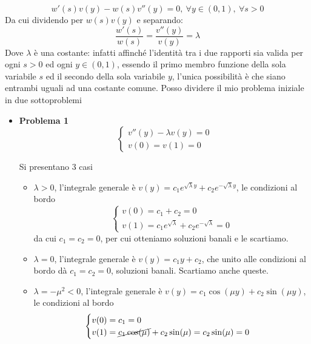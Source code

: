 \begin{equation*}
    w'(s) v(y) -w(s) v'' (y) =0,\ \forall y\in (0,1),\ \forall s >0
\end{equation*}
Da cui dividendo per $\displaystyle w(s) v(y)$ e separando:
\begin{equation*}
    \frac{w'(s)}{w(s)} =\frac{v'' (y)}{v(y)} =\lambda
\end{equation*}
Dove $\displaystyle \lambda $ è una costante: infatti affinché l'identità tra i due rapporti sia valida per ogni $s >0$ ed ogni $\displaystyle y\in (0,1)$, essendo il primo membro funzione della sola variabile $s$ ed il secondo della sola variabile $y$, l'unica possibilità è che siano entrambi uguali ad una costante comune. Posso dividere il mio problema iniziale in due sottoproblemi
\begin{itemize}
    \item \textbf{Problema 1}
          \begin{equation*}
              \begin{cases}
                  v'' (y) -\lambda v(y) =0 \\
                  v(0) =v(1) =0
              \end{cases}
          \end{equation*}

          Si presentano 3 casi
          \begin{itemize}
              \item $\displaystyle \lambda  >0$, l'integrale generale è $\displaystyle v(y) =c_{1} e^{\sqrt{\lambda } y} +c_{2} e^{-\sqrt{\lambda } y}$, le condizioni al bordo
                    \begin{equation*}
                        \begin{cases}
                            v(0) =c_{1} +c_{2} =0 \\
                            v(1) =c_{1} e^{\sqrt{\lambda }} +c_{2} e^{-\sqrt{\lambda }} =0
                        \end{cases}
                    \end{equation*}da cui $\displaystyle c_{1} =c_{2} =0$, per cui otteniamo soluzioni banali e le scartiamo.
              \item $\displaystyle \lambda =0$, l'integrale generale è $\displaystyle v(y) =c_{1} y+c_{2}$, che unito alle condizioni al bordo dà $\displaystyle c_{1} =c_{2} =0$, soluzioni banali. Scartiamo anche queste.
              \item $\displaystyle \lambda =-\mu ^{2} < 0$, l'integrale generale è $\displaystyle v(y) =c_{1}\cos(\mu y) +c_{2}\sin(\mu y)$, le condizioni al bordo
                    \begin{equation*}
                        \begin{cases}
                            v(0) =c_{1} =0 \\
                            v(1) =\cancel{c_{1}\cos(\mu)} +c_{2}\sin(\mu) =c_{2}\sin(\mu) =0
                        \end{cases}
                    \end{equation*}


\end{itemize}
\end{itemize}

